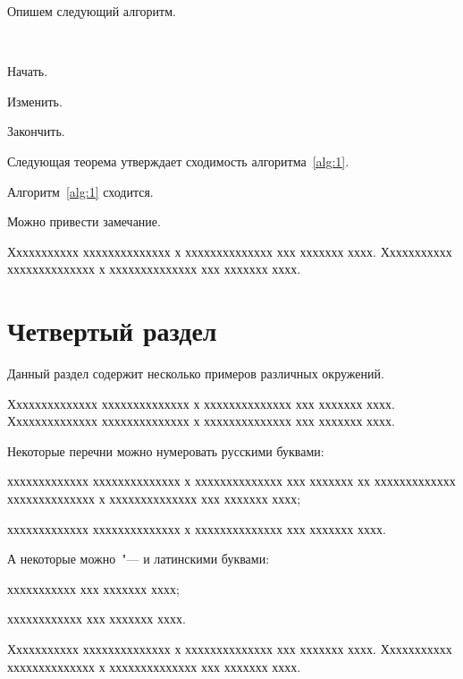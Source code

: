 \documentclass[12pt]{a&t}
\begin{document}
Опишем следующий алгоритм.

\begin{algorithm}[(Быстрый)] \label{alg:1}
\ %

\begin{enumlist}[.] %
\item
Начать.

\item
Изменить.

\item
Закончить.
\end{enumlist}
\end{algorithm}

Следующая теорема утверждает сходимость алгоритма~\ref{alg:1}.

\begin{theorem} \label{th:2}
Алгоритм~{\rm\ref{alg:1}} сходится.
\end{theorem}

Можно привести замечание.

\begin{remark}
Ххххххххххх хххххххххххххх х хххххххххххххх ххх ххххххх хххх.
Ххххххххххх хххххххххххххх х хххххххххххххх ххх ххххххх хххх.
\end{remark}

\section{Четвертый раздел}

Данный раздел содержит несколько примеров различных окружений.

\begin{example}
Хххххххххххххх хххххххххххххх х хххххххххххххх ххх ххххххх хххх.
Хххххххххххххх хххххххххххххх х хххххххххххххх ххх ххххххх хххх.

Некоторые перечни можно нумеровать русскими буквами:
\begin{ruslist} %
\item
ххххххххххххх хххххххххххххх х хххххххххххххх ххх ххххххх хх
ххххххххххххх хххххххххххххх х хххххххххххххх ххх ххххххх хххх;

\item
ххххххххххххх хххххххххххххх х хххххххххххххх ххх ххххххх хххх.
\end{ruslist}

А некоторые можно~"--- и латинскими буквами:

\begin{latlist} %
\item
ххххххххххх ххх ххххххх хххх;

\item
хххххххххххх ххх ххххххх хххх.
\end{latlist}
Ххххххххххх хххххххххххххх х хххххххххххххх ххх ххххххх хххх.
Ххххххххххх хххххххххххххх х хххххххххххххх ххх ххххххх хххх.
\end{example}
\end{document}
